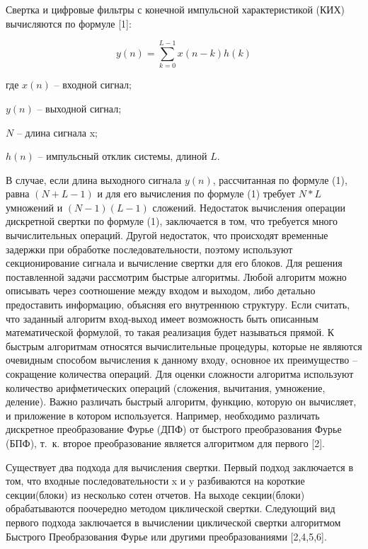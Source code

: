 Свертка и цифровые фильтры с конечной импульсной характеристикой (КИХ) вычисляются по формуле [1]:

\begin{equation}
	\label{eq:y(n)}
	y(n) = \sum_{k=0}^{L-1}x(n-k)h(k)
\end{equation}

где $x(n)$ -- входной сигнал;

$y(n)$ -- выходной сигнал; 

$N$ -- длина сигнала x;

$h(n)$ -- импульсный отклик системы, длиной $L$. 

В случае, если длина выходного сигнала $y(n)$,  рассчитанная по формуле (1), равна $(N+L-1)$ и для его вычисления по формуле (1) требует $N*L$ умножений и $(N-1)(L-1)$ сложений. 
Недостаток вычисления операции дискретной свертки по формуле (1), заключается в том, что требуется много вычислительных операций. Другой недостаток, что происходят временные задержки при обработке последовательности, поэтому используют секционирование сигнала и вычисление свертки для его блоков.
Для решения поставленной задачи рассмотрим быстрые алгоритмы. Любой алгоритм можно описывать через соотношение между входом и выходом, либо детально предоставить информацию, объясняя его внутреннюю структуру. Если считать, что заданный алгоритм вход-выход  имеет возможность  быть описанным математической формулой, то такая реализация будет называться прямой. К быстрым алгоритмам относятся вычислительные процедуры, которые не являются очевидным способом вычисления к данному входу, основное их преимущество – сокращение количества операций.  Для оценки сложности алгоритма используют количество арифметических операций (сложения, вычитания, умножение, деление). Важно различать быстрый алгоритм, функцию, которую он вычисляет, и приложение в котором используется. Например, необходимо различать дискретное преобразование Фурье (ДПФ) от быстрого преобразования Фурье (БПФ), т.~к.  второе преобразование является  алгоритмом для первого [2]. 

Существует два подхода для вычисления свертки. Первый подход заключается в том, что входные последовательности x и y разбиваются на короткие секции(блоки) из несколько сотен отчетов. На выходе секции(блоки) обрабатываются поочередно методом циклической свертки. Следующий вид первого подхода заключается в вычислении циклической свертки алгоритмом Быстрого Преобразования Фурье или другими преобразованиями [2,4,5,6].

